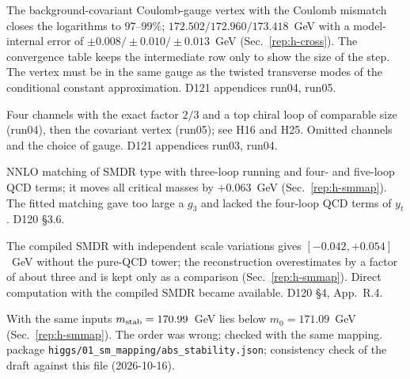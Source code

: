 \begin{description}
{The background-covariant Coulomb-gauge vertex with the Coulomb mismatch closes the logarithms to $97$--$99\%$; $172.502/\allowbreak 172.960/\allowbreak 173.418$~GeV with a model-internal error of $\pm0.008/\pm0.010/\pm0.013$~GeV (Sec.~\ref{rep:h-cross}). The convergence table keeps the intermediate row only to show the size of the step.}
{The vertex must be in the same gauge as the twisted transverse modes of the conditional constant approximation.}
{D121 appendices run04, run05.}

{Four channels with the exact factor $2/3$ and a top chiral loop of comparable size (run04), then the covariant vertex (run05); see H16 and H25.}
{Omitted channels and the choice of gauge.}
{D121 appendices run03, run04.}

{NNLO matching of SMDR type with three-loop running and four- and five-loop QCD terms; it moves all critical masses by $+0.063$~GeV (Sec.~\ref{rep:h-smmap}).}
{The fitted matching gave too large a $g_3$ and lacked the four-loop QCD terms of $y_t$.}
{D120 \S3.6.}

{The compiled SMDR with independent scale variations gives $[-0.042,+0.054]$~GeV without the pure-QCD tower; the reconstruction overestimates by a factor of about three and is kept only as a comparison (Sec.~\ref{rep:h-smmap}).}
{Direct computation with the compiled SMDR became available.}
{D120 \S4, App.~R.4.}

{With the same inputs $m_{\rm stab}=170.99$~GeV lies below $m_0=171.09$~GeV (Sec.~\ref{rep:h-smmap}).}
{The order was wrong; checked with the same mapping.}
{package \texttt{higgs/01\_sm\_mapping/abs\_stability.json}; consistency check of the draft against this file (2026-10-16).}


\end{description}
